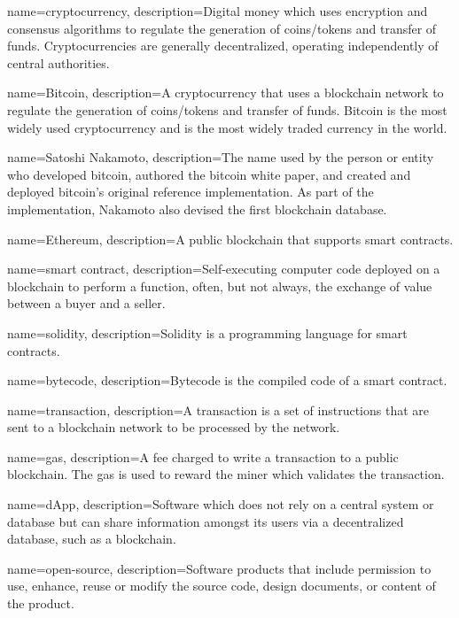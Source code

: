  {
	name=cryptocurrency,
	description={Digital money which uses encryption and consensus algorithms to regulate the generation of coins/tokens and transfer of funds. Cryptocurrencies are generally decentralized, operating independently of central authorities.}
}

 {
	name=Bitcoin,
	description={A cryptocurrency that uses a blockchain network to regulate the generation of coins/tokens and transfer of funds. Bitcoin is the most widely used cryptocurrency and is the most widely traded currency in the world.}
}

 {
	name=Satoshi Nakamoto,
	description={The name used by the person or entity who developed bitcoin, authored the bitcoin white paper, and created and deployed bitcoin's original reference implementation. As part of the implementation, Nakamoto also devised the first blockchain database.}
}


 {
	name=Ethereum,
	description={A public blockchain that supports smart contracts.}
}

 {
	name=smart contract,
	description={Self-executing computer code deployed on a blockchain to perform a function, often, but not always, the exchange of value between a buyer and a seller.}
}

 {
	name=solidity,
	description={Solidity is a programming language for smart contracts.}
}

 {
	name=bytecode,
	description={Bytecode is the compiled code of a smart contract.}
}

 {
	name=transaction,
	description={A transaction is a set of instructions that are sent to a blockchain network to be processed by the network.}
}

 {
	name=gas,
	description={A fee charged to write a transaction to a public blockchain. The gas is used to reward the miner which validates the transaction.}
}

 {
	name=dApp,
	description={Software which does not rely on a central system or database but can share information amongst its users via a decentralized database, such as a blockchain.}
}

 {
	name=open-source,
	description={Software products that include permission to use, enhance, reuse or modify the source code, design documents, or content of the product.}
}


